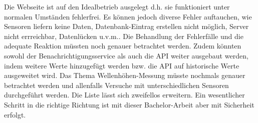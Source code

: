 

Die Webseite ist auf den Idealbetrieb ausgelegt d.h. sie funktioniert unter normalen Umständen fehlerfrei. Es können jedoch diverse Fehler auftauchen, wie Sensoren liefern keine Daten, Datenbank-Eintrag erstellen nicht möglich, Server nicht errreichbar, Datenlücken u.v.m.. Die Behandlung der Fehlerfälle und die adequate Reaktion müssten noch genauer betrachtet werden. Zudem könnten sowohl der Benachrichtigungsservice als auch die API weiter ausgebaut werden, indem weitere Werte hinzugefügt werden bzw. die API auf historische Werte ausgeweitet wird. Das Thema Wellenhöhen-Messung müsste nochmals genauer betrachtet werden und allenfalls Versuche mit unterschiedlichen Sensoren durchgeführt werden.
Die Liste lässt sich zweifellos erweitern. Ein wesentlicher Schritt in die richtige Richtung ist mit dieser Bachelor-Arbeit aber mit Sicherheit erfolgt.
